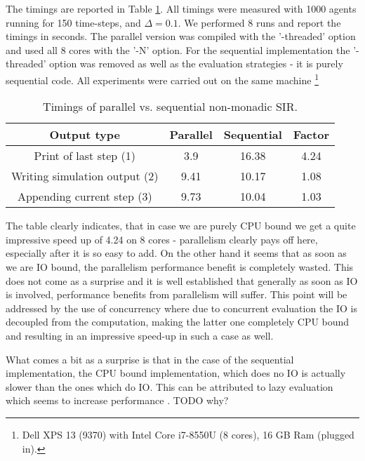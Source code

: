 The timings are reported in Table \ref{tab:parallel_nonmonadic_sir_timings}. All timings were measured with 1000 agents running for 150 time-steps, and $\Delta = 0.1$. We performed 8 runs and report the timings in seconds. The parallel version was compiled with the '-threaded' option and used all 8 cores with the '-N' option. For the sequential implementation the '-threaded' option was removed as well as the evaluation strategies - it is purely sequential code. All experiments were carried out on the same machine \footnote{Dell XPS 13 (9370) with Intel Core i7-8550U (8 cores), 16 GB Ram (plugged in).}

\begin{table}
	\centering
	\begin{tabular}{ c || c | c | c }
		Output type                   & Parallel & Sequential & Factor \\ \hline
		Print of last step (1)        & 3.9      & 16.38      & 4.24 \\ \hline
		Writing simulation output (2) & 9.41     & 10.17      & 1.08 \\ \hline
		Appending current step (3)    & 9.73     & 10.04      & 1.03 \\ \hline
	\end{tabular}
	
	\caption{Timings of parallel vs. sequential non-monadic SIR.}
	\label{tab:parallel_nonmonadic_sir_timings}
\end{table}

The table clearly indicates, that in case we are purely CPU bound we get a quite impressive speed up of 4.24 on 8 cores - parallelism clearly pays off here, especially after it is so easy to add. On the other hand it seems that as soon as we are IO bound, the parallelism performance benefit is completely wasted. This does not come as a surprise and it is well established that generally as soon as IO is involved, performance benefits from parallelism will suffer. This point will be addressed by the use of concurrency where due to concurrent evaluation the IO is decoupled from the computation, making the latter one completely CPU bound and resulting in an impressive speed-up in such a case as well.

What comes a bit as a surprise is that in the case of the sequential implementation, the CPU bound implementation, which does no IO is actually slower than the ones which do IO. This can be attributed to lazy evaluation which seems to increase performance . TODO why?

